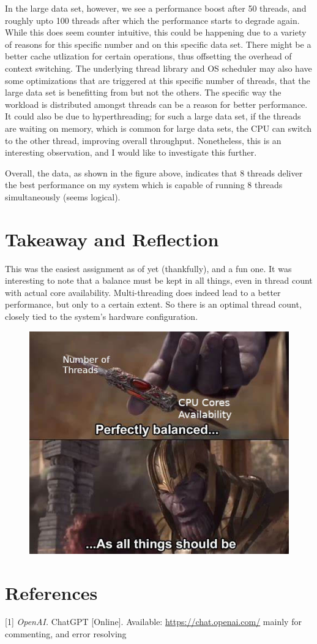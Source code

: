 \documentclass{article}
\theoremstyle{mytheoremstyle}
\theoremstyle{mytheoremstyle}
\theoremstyle{myproblemstyle}
\begin{document}
In the large data set, however, we see a performance boost after 50 threads, and roughly upto 100 threads after which the performance starts to degrade again. While this does seem counter intuitive, this could be happening due to a variety of reasons for this specific number and on this specific data set. There might be a better cache utlization for certain operations, thus offsetting the overhead of context switching. The underlying thread library and OS scheduler may also have some optimizations that are triggered at this specific number of threads, that the large data set is benefitting from but not the others. The specific way the workload is distributed amongst threads can be a reason for better performance. It could also be due to hyperthreading; for such a large data set, if the threads are waiting on memory, which is common for large data sets, the CPU can switch to the other thread, improving overall throughput. Nonetheless, this is an interesting observation, and I would like to investigate this further.

Overall, the data, as shown in the figure above, indicates that 8 threads deliver the best performance on my system which is capable of running 8 threads simultaneously (seems logical).

\newpage
\section{Takeaway and Reflection}
This was the easiest assignment as of yet (thankfully), and a fun one. It was interesting to note that a balance must be kept in all things, even in thread count with actual core availability. Multi-threading does indeed lead to a better performance, but only to a certain extent. So there is an optimal thread count, closely tied to the system's hardware configuration.

\begin{figure}[htbp]
  \centering
  \includegraphics[width=1.0\textwidth]{balance_best.jpeg}
\end{figure}

\section{References}
 [1] \textit{OpenAI.} ChatGPT [Online]. Available: \url{https://chat.openai.com/} mainly for commenting, and error resolving
\end{document}
